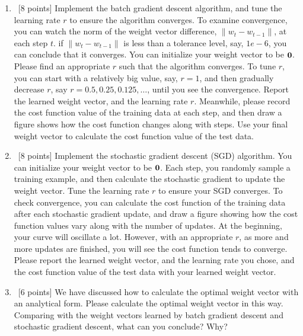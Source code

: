 \documentclass[12pt, fullpage,letterpaper]{article}
\begin{document}
\begin{enumerate}
	\begin{enumerate}
		\item~[8 points] Implement the batch gradient descent algorithm, and tune the learning rate $r$ to ensure the algorithm converges.  To examine convergence, you can watch the norm of the weight vector difference,  $\|w_{t} - w_{t-1}\|$,  at each step $t$.  if $\|w_{t} - w_{t-1}\|$ is  less than a tolerance level, say, $1e-6$, you can conclude that it converges. You can initialize your weight vector to be ${\bf 0}$.  Please find an appropriate $r$ such that the algorithm converges. To tune $r$, you can start with a relatively big value, say, $r=1$, and then gradually decrease $r$, say $r=0.5, 0.25, 0.125, \ldots$, until you see the convergence. 
		Report the learned weight vector, and the learning rate $r$. Meanwhile, please record the cost function  value of the training data at each step, and then draw a figure shows how the cost function changes along with steps. Use your final weight vector to calculate  the cost function value of the test data. 
		\item~[8 points] Implement the stochastic gradient descent (SGD) algorithm. You can initialize your weight vector to be ${\bf 0}$. Each step, you randomly sample a training example, and then calculate the stochastic gradient to update the weight vector.  Tune the learning rate $r$ to ensure your SGD converges. To check convergence, you can calculate the cost function of the training data after each stochastic gradient update, and draw a figure showing how the cost function values vary along with the number of updates. At the beginning, your curve will oscillate a lot. However, with an appropriate $r$, as more and more updates are finished, you will see the cost function tends to converge. Please report the learned weight vector, and the learning rate you chose, and the cost function value of the test data with your learned weight vector.   
		\item~[6 points] We have discussed how to  calculate the optimal weight vector with an analytical form. Please calculate the optimal weight vector in this way. Comparing with the  weight vectors learned by batch gradient descent and stochastic gradient descent, what can you conclude? Why?
	\end{enumerate}

\end{enumerate}
\end{document}
